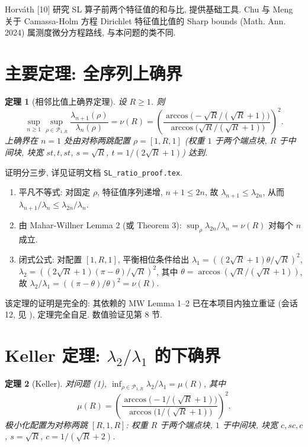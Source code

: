 \documentclass[UTF8]{ctexart}
\newtheorem{theorem}{定理}[section]
\begin{document}
Horv\'ath [10] 研究 SL 算子前两个特征值的和与比, 提供基础工具. Chu 与 Meng 关于 Camassa-Holm 方程 Dirichlet 特征值比值的 Sharp bounds (Math. Ann. 2024) 属测度微分方程路线, 与本问题的类不同.

\section{主要定理: 全序列上确界}

\begin{theorem}[相邻比值上确界定理]
设 $R \geq 1$. 则
\begin{equation}
	\sup_{n \geq 1} \sup_{\rho \in \mathcal{P}_{1,R}} \frac{\lambda_{n+1}(\rho)}{\lambda_n(\rho)}
	= \nu(R) = \left( \frac{\arccos\!\bigl(-\sqrt{R}/(\sqrt{R}+1)\bigr)}
	{\arccos\!\bigl(\sqrt{R}/(\sqrt{R}+1)\bigr)} \right)^2 .
\end{equation}
上确界在 $n = 1$ 处由对称两跳配置 $\rho = [1, R, 1]$ (权重 $1$ 于两个端点块, $R$ 于中间块,
块宽 $s t, t, s t$, $s = \sqrt{R}$, $t = 1/(2\sqrt{R}+1)$) 达到.
\end{theorem}

证明分三步, 详见证明文档 \texttt{SL\_ratio\_proof.tex}.

\begin{enumerate}
	\item 平凡不等式: 对固定 $\rho$, 特征值序列递增, $n+1 \leq 2n$, 故
		$\lambda_{n+1} \leq \lambda_{2n}$, 从而
		$\lambda_{n+1}/\lambda_n \leq \lambda_{2n}/\lambda_n$.
	\item 由 Mahar-Willner Lemma 2 (或 Theorem 3):
		$\sup_{\rho} \lambda_{2n}/\lambda_n = \nu(R)$ 对每个 $n$ 成立.
	\item 闭式公式: 对配置 $[1, R, 1]$, 平衡相位条件给出
		$\lambda_1 = ((2\sqrt{R}+1)\theta/\sqrt{R})^2$, $\lambda_2 = ((2\sqrt{R}+1)(\pi-\theta)/\sqrt{R})^2$,
		其中 $\theta = \arccos(\sqrt{R}/(\sqrt{R}+1))$, 故 $\lambda_2/\lambda_1 = ((\pi-\theta)/\theta)^2 = \nu(R)$.
\end{enumerate}

该定理的证明是完全的: 其依赖的 MW Lemma 1--2 已在本项目内独立重证
(会话 12, 见 ), 定理完全自足.
数值验证见第 8 节.

\section{Keller 定理: \texorpdfstring{$\lambda_2/\lambda_1$}{lambda2/lambda1} 的下确界}

\begin{theorem}[Keller]
对问题 (1), $\inf_{\rho \in \mathcal{P}_{1,R}} \lambda_2/\lambda_1 = \mu(R)$, 其中
\begin{equation}
	\mu(R) = \left( \frac{\arccos\!\bigl(-1/(\sqrt{R}+1)\bigr)}
	{\arccos\!\bigl(1/(\sqrt{R}+1)\bigr)} \right)^2 .
\end{equation}
极小化配置为对称两跳 $[R, 1, R]$: 权重 $R$ 于两个端点块, $1$ 于中间块,
块宽 $c, s c, c$, $s = \sqrt{R}$, $c = 1/(\sqrt{R}+2)$.
\end{theorem}
\end{document}
